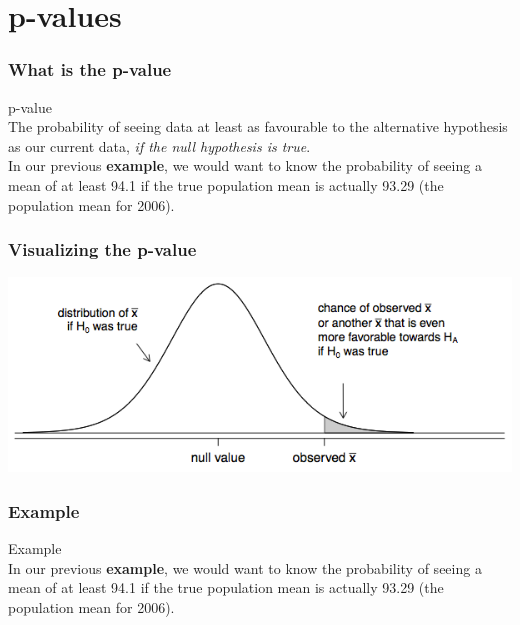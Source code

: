 \documentclass{beamer}\usepackage{graphicx, color}
\begin{document}
\section{p-values}

\begin{frame}[fragile]
  \frametitle{What is the p-value}
{\LARGE{p-value}} \\[0.5cm]
  The probability of seeing data at least as favourable to the alternative hypothesis as our current data, {\emph{if the null hypothesis is true}}. \\[0.5cm]
  In our previous {\bf{example}}, we would want to know the probability of seeing a mean of at least 94.1 if the true population mean is actually 93.29 (the population mean for 2006).
\end{frame}

\begin{frame}[fragile]
  \frametitle{Visualizing the p-value}
  \begin{center}
    \includegraphics[scale=0.5]{figure/AbstractP.png}
  \end{center}
\end{frame}

\begin{frame}[fragile]
  \frametitle{Example}
{\LARGE{Example}} \\[0.5cm]
  In our previous {\bf{example}}, we would want to know the probability of seeing a mean of at least 94.1 if the true population mean is actually 93.29 (the population mean for 2006). \\[0.5cm]
\end{frame}
\end{document}
